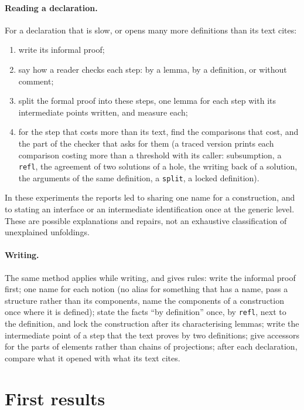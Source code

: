 \documentclass[11pt]{article}
\newcommand{\kw}[1]{\texttt{#1}}
\begin{document}
\paragraph{Reading a declaration.} For a declaration that is slow, or
opens many more definitions than its text cites:
\begin{enumerate}
\item write its informal proof;
\item say how a reader checks each step: by a lemma, by a definition, or
  without comment;
\item split the formal proof into these steps, one lemma for each step
  with its intermediate points written, and measure each;
\item for the step that costs more than its text, find the comparisons
  that cost, and the part of the checker that asks for them (a traced
  version prints each comparison costing more than a threshold with its
  caller: subsumption, a \kw{refl}, the agreement of two solutions of a
  hole, the writing back of a solution, the arguments of the same
  definition, a \kw{split}, a locked definition).
\end{enumerate}
In these experiments the reports led to sharing one name for a construction, and to stating an interface or an
intermediate identification once at the generic level. These are
possible explanations and repairs, not an exhaustive classification of
unexplained unfoldings.

\paragraph{Writing.} The same method applies while writing, and gives
rules: write the informal proof first; one name for each notion (no
alias for something that has a name, pass a structure rather than its
components, name the components of a construction once where it is
defined); state the facts ``by definition'' once, by \kw{refl}, next to
the definition, and lock the construction after its characterising
lemmas; write the intermediate point of a step that the text proves by
two definitions; give accessors for the parts of elements rather than
chains of projections; after each declaration, compare what it opened
with what its text cites.

\section{First results}\label{sec:results}
\end{document}
